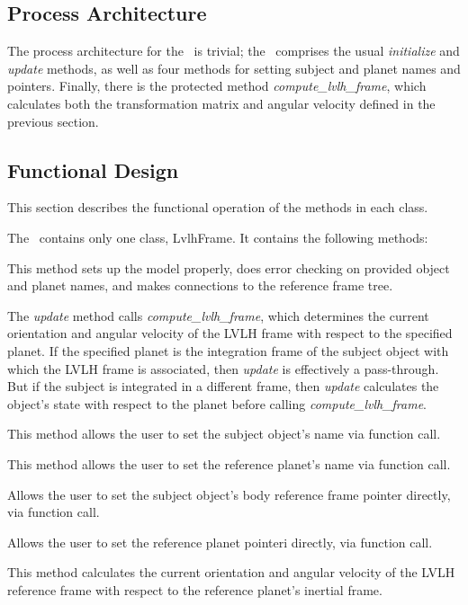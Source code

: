 \subsection{Process Architecture}
The process architecture for the \LvlhFrameDesc\ is trivial; the \LvlhFrameDesc\
comprises the usual \textit{initialize} and \textit{update} methods, as
well as four methods for setting subject and planet names and pointers.
Finally, there is the protected method \textit{compute\_lvlh\_frame},
which calculates both the transformation matrix and angular velocity defined
in the previous section.

\subsection{Functional Design}
This section describes the functional operation of the methods in each class.

The \LvlhFrameDesc\ contains only one class, LvlhFrame. It contains the
following methods:
\begin{enumerate}

This method sets up the model properly, does error checking on provided
object and planet names, and makes connections to the reference frame tree.

The \textit{update} method calls \textit{compute\_lvlh\_frame}, which
determines the current orientation and angular velocity of the LVLH frame
with respect to the specified planet. If the specified planet is the
integration frame of the subject object with which the LVLH frame is
associated, then \textit{update} is effectively a pass-through. But
if the subject is integrated in a different frame, then \textit{update}
calculates the object's state with respect to the planet before calling
\textit{compute\_lvlh\_frame}.

This method allows the user to set the subject object's name via
function call.

This method allows the user to set the reference planet's name via
function call.

Allows the user to set the subject object's body reference frame
pointer directly, via function call.

Allows the user to set the reference planet pointeri directly, via
function call.

This method calculates the current orientation and angular velocity
of the LVLH reference frame with respect to the reference planet's
inertial frame.

\end{enumerate}


